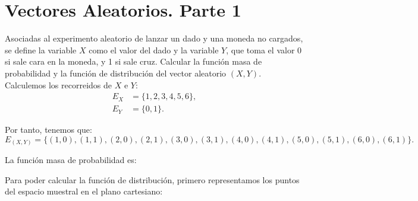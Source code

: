 \section{Vectores Aleatorios. Parte 1}

\begin{ejercicio}
    Asociadas al experimento aleatorio de lanzar un dado y una moneda no cargados, se define la variable $X$ como el valor del dado y la variable $Y$, que toma el valor 0 si sale cara en la moneda, y 1 si sale cruz. Calcular la función masa de probabilidad y la función de distribución del vector aleatorio $(X,Y)$.\\

    Calculemos los recorreidos de $X$ e $Y$:
    \begin{align*}
        E_X &= \{1, 2, 3, 4, 5, 6\}, \\
        E_Y &= \{0, 1\}.
    \end{align*}

    Por tanto, tenemos que:
    \begin{equation*}
        E_{(X,Y)} = \{(1,0), (1,1), (2,0), (2,1), (3,0), (3,1), (4,0), (4,1), (5,0), (5,1), (6,0), (6,1)\}.
    \end{equation*}

    La función masa de probabilidad es:

    Para poder calcular la función de distribución, primero representamos los puntos del espacio muestral en el plano cartesiano:
    \begin{figure}[H]
        \centering
\end{figure}
\end{ejercicio}
